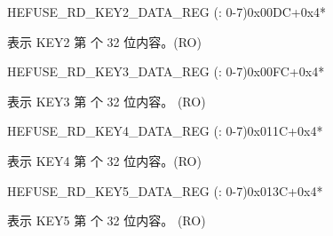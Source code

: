 \begin{register}{H}{EFUSE\_RD\_KEY2\_DATA\_REG (: 0-7)}{0x00DC+0x4*}\label{regdesc:EFUSERDKEY2DATANREG}
%
\regnewline%
\begin{regdesc}\begin{reglist}
\label{fielddesc:EFUSEKEY2DATAN}\item [EFUSE\_KEY2\_DATA\regindex{n}] 表示 KEY2 第  个 32 位内容。(RO)
\end{reglist}\end{regdesc}
\end{register}


\begin{register}{H}{EFUSE\_RD\_KEY3\_DATA\_REG (: 0-7)}{0x00FC+0x4*}\label{regdesc:EFUSERDKEY3DATAMREG}
%
\regnewline%
\begin{regdesc}\begin{reglist}
\label{fielddesc:EFUSEKEY3DATAM}\item [EFUSE\_KEY3\_DATA\regindex{m}] 表示 KEY3 第  个 32 位内容。 (RO)
\end{reglist}\end{regdesc}
\end{register}


\begin{register}{H}{EFUSE\_RD\_KEY4\_DATA\_REG (: 0-7)}{0x011C+0x4*}\label{regdesc:EFUSERDKEY4DATANREG}
%
\regnewline%
\begin{regdesc}\begin{reglist}
\label{fielddesc:EFUSEKEY4DATAN}\item [EFUSE\_KEY4\_DATA\regindex{n}] 表示 KEY4 第  个 32 位内容。(RO)
\end{reglist}\end{regdesc}
\end{register}


\begin{register}{H}{EFUSE\_RD\_KEY5\_DATA\_REG (: 0-7)}{0x013C+0x4*}\label{regdesc:EFUSERDKEY5DATAMREG}
%
\regnewline%
\begin{regdesc}\begin{reglist}
\label{fielddesc:EFUSEKEY5DATAM}\item [EFUSE\_KEY5\_DATA\regindex{m}] 表示 KEY5 第  个 32 位内容。 (RO)
\end{reglist}\end{regdesc}
\end{register}


